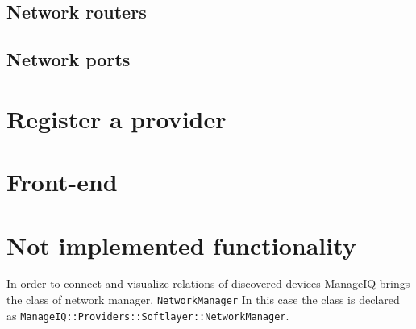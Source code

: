 \subsection{Network routers}
\label{sub:Network routers}

\subsection{Network ports}
\label{sub:Network ports}

\section{Register a provider}
\label{sec:Register a provider}

\section{Front-end}
\label{sec:Front-end}

\section{Not implemented functionality}
\label{sec:Not implemented functionality}


In order to connect and visualize relations of discovered devices ManageIQ brings the class of network manager. \texttt{NetworkManager} In this case the class is declared as \texttt{ManageIQ::Providers::Softlayer::NetworkManager}.
